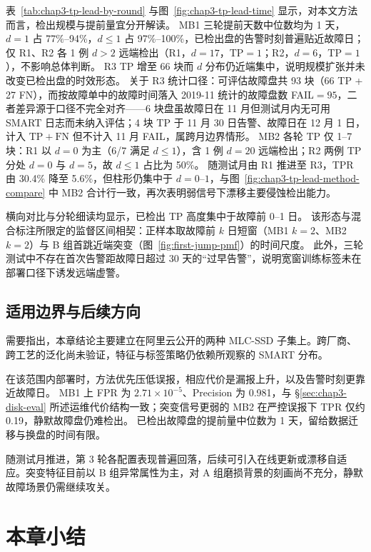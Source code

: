 表~\ref{tab:chap3-tp-lead-by-round} 与图~\ref{fig:chap3-tp-lead-time} 显示，对本文方法而言，检出规模与提前量宜分开解读。
MB1 三轮提前天数中位数均为 1 天，$d=1$ 占 77\%--94\%，$d\le 1$ 占 97\%--100\%，已检出盘的告警时刻普遍贴近故障日；仅 R1、R2 各 1 例 $d>2$ 远端检出（R1，$d{=}17$，TP${=}1$；R2，$d{=}6$，TP${=}1$），不影响总体判断。
R3 TP 增至 66 块而 $d$ 分布仍近端集中，说明规模扩张并未改变已检出盘的时效形态。
关于 R3 统计口径：可评估故障盘共 93 块（66 TP + 27 FN），而按故障单中的故障时间落入 2019-11 统计的故障盘数 FAIL${=}95$，二者差异源于口径不完全对齐——6 块盘虽故障日在 11 月但测试月内无可用 SMART 日志而未纳入评估；4 块 TP 于 11 月 30 日告警、故障日在 12 月 1 日，计入 $\mathrm{TP}+\mathrm{FN}$ 但不计入 11 月 FAIL，属跨月边界情形。
MB2 各轮 TP 仅 1--7 块：R1 以 $d=0$ 为主（6/7 满足 $d\le 1$），含 1 例 $d=20$ 远端检出；R2 两例 TP 分处 $d=0$ 与 $d=5$，故 $d\le 1$ 占比为 50\%。
随测试月由 R1 推进至 R3，TPR 由 30.4\% 降至 5.6\%，但柱形仍集中于 $d=0$--$1$，与图~\ref{fig:chap3-tp-lead-method-compare} 中 MB2 合计行一致，再次表明弱信号下漂移主要侵蚀检出能力。

横向对比与分轮细读均显示，已检出 TP 高度集中于故障前 0--1 日。
该形态与混合标注所限定的监督区间相契：正样本取故障前 $k$ 日短窗（MB1 $k{=}2$、MB2 $k{=}2$）与 B 组首跳近端突变（图~\ref{fig:first-jump-pmf}）的时间尺度。
此外，三轮测试中不存在首次告警距故障日超过 30 天的“过早告警”，说明宽窗训练标签未在部署口径下诱发远端虚警。


\subsection{适用边界与后续方向}

需要指出，本章结论主要建立在阿里云公开的两种 MLC-SSD 子集上。跨厂商、跨工艺的泛化尚未验证，特征与标签策略仍依赖所观察的 SMART 分布。

在该范围内部署时，方法优先压低误报，相应代价是漏报上升，以及告警时刻更靠近故障日。
MB1 上 FPR 为 $2.71\times10^{-5}$、Precision 为 0.981，与 \S\ref{sec:chap3-disk-eval} 所述运维代价结构一致；突变信号更弱的 MB2 在严控误报下 TPR 仅约 0.19，静默故障盘仍难检出。
已检出故障盘的提前量中位数为 1 天，留给数据迁移与换盘的时间有限。

随测试月推进，第 3 轮各配置表现普遍回落，后续可引入在线更新或漂移自适应。突变特征目前以 B 组异常属性为主，对 A 组磨损背景的刻画尚不充分，静默故障场景仍需继续攻关。

\section{本章小结}

